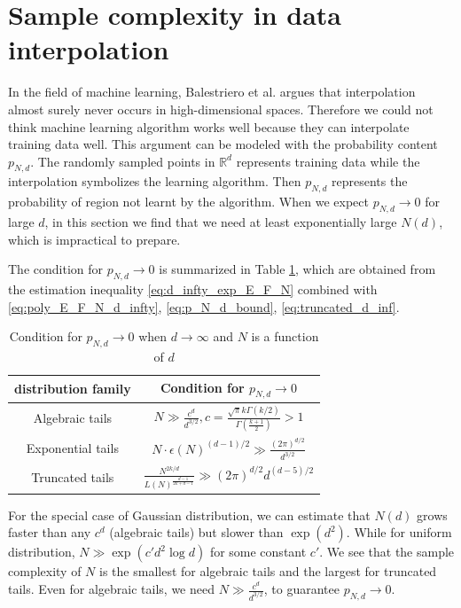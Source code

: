 \documentclass{aptpub}
\def\R{\mathbb{R}}
\begin{document}
\section{Sample complexity in data interpolation}\label{sec:sample_complexity}
In the field of machine learning,
Balestriero et al. \cite{balestriero2021learning}
argues that interpolation almost surely never occurs in high-dimensional spaces.
Therefore we could not think machine learning algorithm works well because they can interpolate training data
well.
This argument can be modeled with the probability content $p_{N,d}$.
The randomly sampled points in $\R^d$ represents training data
while the interpolation
symbolizes the learning algorithm. Then $p_{N,d}$ represents
the probability of region not learnt by the algorithm.
When we expect $p_{N,d} \to 0$ for large $d$,
in this section
we find that we need
at least exponentially large $N(d)$, which is impractical to prepare.

The condition for $p_{N,d} \to 0$ is summarized in Table \ref{tab:cond},
which are obtained
from the estimation inequality \eqref{eq:d_infty_exp_E_F_N}
combined with \eqref{eq:poly_E_F_N_d_infty},
\eqref{eq:p_N_d_bound},
\eqref{eq:truncated_d_inf}.


\begin{table}[!ht]
     \centering
     \begin{tabular}{|c|c|}
         \hline
         distribution family &  Condition for $p_{N,d} \to 0$ \\
         \hline
        Algebraic tails & $N \gg \frac{c^d}{d^{3/2}}, c=\frac{\sqrt{\pi}k\Gamma(k/2)}{\Gamma(\frac{k+1}{2})}>1$ \\
        \hline
        Exponential tails 
        & $ N\cdot \epsilon(N)^{(d-1)/2} \gg \frac{(2\pi)^{d/2}}{d^{3/2}}$ \\
        \hline
        Truncated tails 
        & $\frac{N^{2k/d}}{L(N)^{\frac{d-1}{2k+d-1}}}
        \gg (2\pi)^{d/2}d^{(d-5)/2}$\\
        \hline
     \end{tabular}
     \caption{Condition for $p_{N,d}\to 0$ when $d\to \infty$ and $N$ is a function of $d$}
     \label{tab:cond}
 \end{table}

For the special case of Gaussian distribution, we can estimate that
$N(d)$ grows faster than any $c^d$ (algebraic tails) but slower than $\exp(d^2)$.
While for uniform distribution, $N\gg \exp(c' d^2 \log d)$ for some constant $c'$.
We see that the sample complexity of $N$ is the smallest for algebraic tails and the largest
for truncated tails. Even for algebraic tails, we need $N\gg \frac{c^d}{d^{3/2}}$,
to guarantee $p_{N,d}\to 0$.
\end{document}
